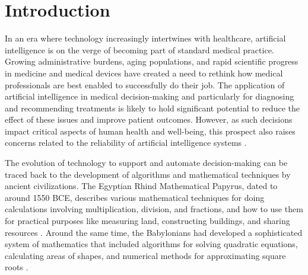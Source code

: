 
\chapter[introduction]{Introduction}\label{chp:introduction}
%
%


In an era where technology increasingly intertwines with healthcare, artificial intelligence is on the verge of becoming part of standard medical practice. 
Growing administrative burdens, aging populations, and rapid scientific progress in medicine and medical devices have created a need to rethink how medical professionals are best enabled to successfully do their job. 
The application of artificial intelligence in medical decision-making and particularly for diagnosing and recommending treatments is likely to hold significant potential to reduce the effect of these issues and improve patient outcomes. 
However, as such decisions impact critical aspects of human health and well-being, this prospect also raises concerns related to the reliability of artificial intelligence systems \parencite{chen_ethical_2021, shailaja_machine_2018, ahmad_interpretable_2018}.

The evolution of technology to support and automate decision-making can be traced back to the development of algorithms and mathematical techniques by ancient civilizations. 
The Egyptian Rhind Mathematical Papyrus, dated to around 1550 BCE, describes various mathematical techniques for doing calculations involving multiplication, division, and fractions, and how to use them for practical purposes like measuring land, constructing buildings, and sharing resources \parencite{georges_universal_2001}. 
Around the same time, the Babylonians had developed a sophisticated system of mathematics that included algorithms for solving quadratic equations, calculating areas of shapes, and numerical methods for approximating square roots \parencite{fowler_square_1998}. 

